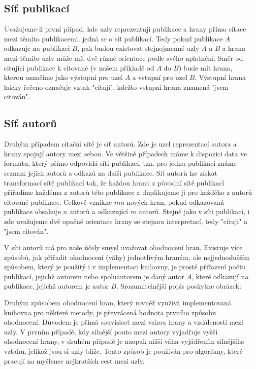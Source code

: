 \documentclass[12pt,titlepage]{report}
\begin{document}
\subsection{Síť publikací}
Uvažujeme-li první případ, kde uzly reprezentují publikace a hrany přímo citace
mezi těmito publikacemi, jedná se o síť publikací. Tedy pokud publikace $A$
odkazuje na publikaci $B$, pak budou existovat stejnojmenné uzly $A$ a $B$ a
hrana mezi těmito uzly může mít dvě různé orientace podle svého uplatnění. Směr
od citující publikace k citované (v našem příkladě od $A$ do $B$) bude mít
hrana, kterou označíme jako výstupní pro uzel $A$ a vstupní pro uzel $B$.
Výstupní hrana laicky řečeno označuje vztah "cituji", kdežto vstupní hrana
znamená "jsem citován".

\subsection{Síť autorů}
Druhým případem citační sítě je síť autorů. Zde je uzel reprezentací autora a
hrany spojují autory mezi sebou. Ve většině případech máme k dispozici data ve
formátu, který přímo odpovídá síti publikací, tzn. pro jednu publikaci známe
seznam jejích autorů a odkazů na další publikace. Síť autorů lze získat
transformací sítě publikací tak, že každou hranu z původní sítě publikací
přiřadíme každému z autorů této publikace a duplikujeme ji pro každého z autorů
citované publikace. Celkově vznikne $nm$ nových hran, pokud odkazovaná
publikace obsahuje $n$ autorů a odkazující $m$ autorů. Stejně jako v síti
publikací, i zde uvažujeme dvě opačné orientace hrany se stejnou interpretací,
tedy "cituji" a "jsem citován". 

V síti autorů má pro naše účely smysl uvažovat
ohodnocení hran. Existuje více způsobů, jak přiřadit ohodnocení (váhy)
jednotlivým hranám, ale nejjednodušším způsobem, který je použitý i v
implementaci knihovny, je prosté přiřazení počtu publikací, jejichž autorem
nebo spoluautorem je daný autor $A$, které odkazují na publikace, jejichž
autorem je autor $B$. Srozumitelnější popis poskytne obrázek:

Druhým způsobem ohodnocení hran, který rovněž využívá implementovaná knihovna
pro některé metody, je převrácená hodnota prvního způsobu ohodnocení. Důvodem
je přímá souvislost mezi vahou hrany a vzdáleností mezi uzly. V prvním případě,
kdy silnější pouto mezi autory vyjadřuje vyšší ohodnocení hrany, v druhém
případě je naopak nižší váha vyjádřením silnějšího vztahu, jelikož jsou si uzly
blíže. Tento způsob je používán pro algoritmy, které pracují na myšlence
nejkratších cest mezi uzly. 
\end{document}
